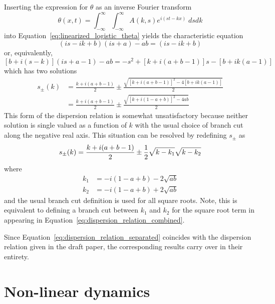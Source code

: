 \documentclass[12pt]{amsart}
\begin{document}
Inserting the expression for $\theta$ as an inverse Fourier transform
\begin{equation}
  \theta(x, t) = \int_{-\infty}^{\infty}\int_{-\infty}^{\infty} A(k, s) e^{i(st-kx)} \; ds dk
\end{equation}
into Equation~\ref{eq:linearized_logistic_theta} yields the characteristic equation
\begin{equation}
(is-ik+b)(is+a) - ab = (is-ik+b) 
\end{equation}
or, equivalently, 
\begin{equation}
  \left[b+i(s-k)\right](is+a-1) - ab = -s^2 + \left[k+i(a+b-1)\right]s -
  \left[b + ik(a-1)\right]
\end{equation}
which has two solutions 
\begin{align}
  s_{\pm}(k)
  & = \frac{k + i(a+b-1)}{2} \pm \frac{\sqrt{\left[k + i(a+b-1)\right]^2-4\left[b+ik(a-1)\right]}}{2} \\
  & = \frac{k + i(a+b-1)}{2} \pm \frac{\sqrt{\left[k + i(1-a+b)\right]^2-4ab}}{2}
  \label{eq:dispersion_relation_combined}
\end{align}
This form of the dispersion relation is somewhat unsatisfactory
because neither solution is single valued as a function of $k$ with
the usual choice of branch cut along the negative real axis.  This 
situation can be resolved by redefining $s_{\pm}$ as
\begin{equation}
  s_{\pm}(k) = \frac{k + i(a+b-1)}{2} \pm \frac{1}{2}\sqrt{k - k_1}\sqrt{k - k_2} \\
  \label{eq:dispersion_relation_separated}
\end{equation}
where
\begin{align}
  k_1 & = -i(1-a+b)-2\sqrt{ab} \\
  k_2 & = -i(1-a+b)+2\sqrt{ab}   
\end{align}
and the usual branch cut definition is used for all square roots.
Note, this is equivalent to defining a branch cut between $k_1$ and
$k_2$ for the square root term in appearing in
Equation~\ref{eq:dispersion_relation_combined}.

Since Equation~\ref{eq:dispersion_relation_separated} coincides with
the dispersion relation given in the draft paper, the corresponding
results carry over in their entirety.


\section{Non-linear dynamics}
\end{document}

